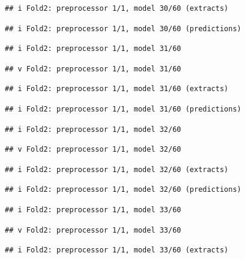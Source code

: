 \documentclass[
]{article}
\begin{document}
\begin{verbatim}
## i Fold2: preprocessor 1/1, model 30/60 (extracts)
\end{verbatim}

\begin{verbatim}
## i Fold2: preprocessor 1/1, model 30/60 (predictions)
\end{verbatim}

\begin{verbatim}
## i Fold2: preprocessor 1/1, model 31/60
\end{verbatim}

\begin{verbatim}
## v Fold2: preprocessor 1/1, model 31/60
\end{verbatim}

\begin{verbatim}
## i Fold2: preprocessor 1/1, model 31/60 (extracts)
\end{verbatim}

\begin{verbatim}
## i Fold2: preprocessor 1/1, model 31/60 (predictions)
\end{verbatim}

\begin{verbatim}
## i Fold2: preprocessor 1/1, model 32/60
\end{verbatim}

\begin{verbatim}
## v Fold2: preprocessor 1/1, model 32/60
\end{verbatim}

\begin{verbatim}
## i Fold2: preprocessor 1/1, model 32/60 (extracts)
\end{verbatim}

\begin{verbatim}
## i Fold2: preprocessor 1/1, model 32/60 (predictions)
\end{verbatim}

\begin{verbatim}
## i Fold2: preprocessor 1/1, model 33/60
\end{verbatim}

\begin{verbatim}
## v Fold2: preprocessor 1/1, model 33/60
\end{verbatim}

\begin{verbatim}
## i Fold2: preprocessor 1/1, model 33/60 (extracts)
\end{verbatim}
\end{document}
